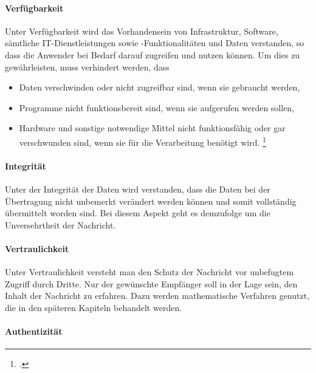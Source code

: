 \documentclass  [paper=a4,
				fontsize=12pt,
				listof=totoc,
				bibliography=totoc
				]{scrreprt}
\begin{document}
	\paragraph{Verfügbarkeit}
	
	Unter Verfügbarkeit wird das Vorhandensein von Infrastruktur, Software, sämtliche IT-Dienstleistungen sowie -Funktionalitäten und Daten verstanden, so dass die Anwender bei Bedarf darauf zugreifen und nutzen können. Um dies zu gewährleisten, muss verhindert werden, dass
	\begin{itemize}
	\item Daten verschwinden oder nicht zugreifbar sind, wenn sie gebraucht werden,
	\item Programme nicht funktionsbereit sind, wenn sie aufgerufen werden sollen,
	\item Hardware und sonstige notwendige Mittel nicht funktionsfähig oder gar verschwunden sind, wenn sie für die Verarbeitung benötigt wird. \footcite{Berliner2014}
	\end{itemize}
	
	\paragraph{Integrität}
	Unter der Integrität der Daten wird verstanden, dass die Daten bei der Übertragung nicht unbemerkt verändert werden können und somit vollständig übermittelt worden sind. Bei diesem Aspekt geht es demzufolge um die Unversehrtheit der Nachricht.
	
	\paragraph{Vertraulichkeit}
	
	Unter Vertraulichkeit versteht man den Schutz der Nachricht vor unbefugtem Zugriff durch Dritte. Nur der gewünschte Empfänger soll in der Lage sein, den Inhalt der Nachricht zu erfahren. Dazu werden mathematische Verfahren genutzt, die in den späteren Kapiteln behandelt werden.
	
	\paragraph{Authentizität}
	
\end{document}
